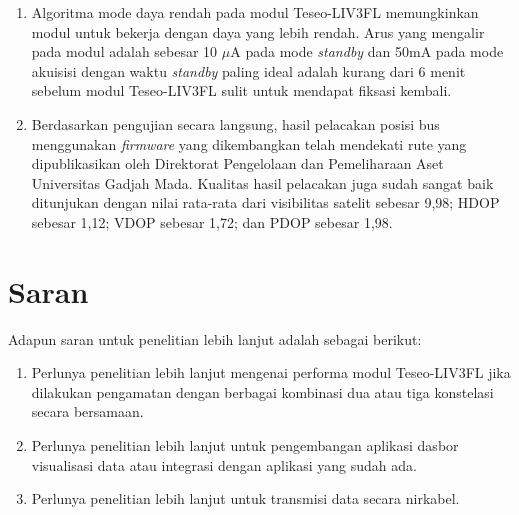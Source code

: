 \begin{enumerate}
	\item Algoritma mode daya rendah pada modul Teseo\hyp{}LIV3FL memungkinkan modul untuk bekerja dengan daya yang lebih rendah. Arus yang mengalir pada modul adalah sebesar 10 $\mu$A pada mode \textit{standby} dan 50mA pada mode akuisisi dengan waktu \textit{standby} paling ideal adalah kurang dari 6 menit sebelum modul Teseo\hyp{}LIV3FL sulit untuk mendapat fiksasi kembali.
	
	\item Berdasarkan pengujian secara langsung, hasil pelacakan posisi bus menggunakan \textit{firmware} yang dikembangkan telah mendekati rute yang dipublikasikan oleh Direktorat Pengelolaan dan Pemeliharaan Aset Universitas Gadjah Mada. Kualitas hasil pelacakan juga sudah sangat baik ditunjukan dengan nilai rata-rata dari visibilitas satelit sebesar 9,98; HDOP sebesar 1,12; VDOP sebesar 1,72; dan PDOP sebesar 1,98.
\end{enumerate}
\section{Saran}
Adapun saran untuk penelitian lebih lanjut adalah sebagai berikut:
\begin{enumerate}
	\item Perlunya penelitian lebih lanjut mengenai performa modul Teseo\hyp{}LIV3FL jika dilakukan pengamatan dengan berbagai kombinasi dua atau tiga konstelasi secara bersamaan.
	
	\item Perlunya penelitian lebih lanjut untuk pengembangan aplikasi dasbor visualisasi data atau integrasi dengan aplikasi yang sudah ada.
	
	\item Perlunya penelitian lebih lanjut untuk transmisi data secara nirkabel.
\end{enumerate}

